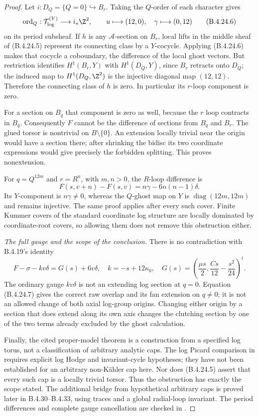 \begin{proof}
Let $i:D_Q=\{Q=0\}\hookrightarrow B_r$.
Taking the $Q$-order of each character gives
\[
 \operatorname{ord}_Q:
 \mathcal T_{\log}^{(Y)}\longrightarrow i_*\Z^2,
 \qquad
 u\longmapsto(12,0),\quad
 \gamma\longmapsto(0,12)
 \tag{B.4.24.6}
\]
on its period subsheaf. If $h$ is any
$\mathcal A$-section on $B_r$, local lifts in
the middle sheaf of (B.4.24.5) represent its
connecting class by a $Y$-cocycle. Applying
(B.4.24.6) makes that cocycle a coboundary,
the difference of the local ghost vectors.
But restriction identifies $H^1(B_r,Y)$ with
$H^1(D_Q,Y)$, since $B_r$ retracts onto $D_Q$;
the induced map to $H^1(D_Q,\Z^2)$ is the
injective diagonal map $(12,12)$. Therefore
the connecting class of $h$ is zero. In
particular its $r$-loop component is zero.

For a section on $B_q$ that component is zero
as well, because the $r$ loop contracts in $B_q$.
Consequently $F$ cannot be the difference of
sections from $B_q$ and $B_r$. The glued torsor
is nontrivial on $B\setminus\{0\}$. An extension
locally trivial near the origin would have a
section there; after shrinking the bidisc its
two coordinate expressions would give precisely
the forbidden splitting. This proves nonextension.

For $q=Q^{12m}$ and $r=R^n$, with $m,n>0$,
the $R$-loop difference is
\[
 F(s,v+n)-F(s,v)
    =n\gamma-6n(n-1)\delta.
\]
Its $Y$-component is $n\gamma\ne0$,
whereas the $Q$-ghost map on $Y$ is
$\operatorname{diag}(12m,12m)$ and remains
injective. The same proof applies after every
such cover. Finite Kummer covers of the standard
coordinate log structure are locally dominated
by coordinate-root covers, so allowing them
does not remove this obstruction either.

\emph{The full gauge and the scope of the conclusion.}
There is no contradiction with B.4.19's identity
\[
 F-\sigma-kv\delta=G(s)+6v\delta,
 \quad k=-s+12\kappa_0,
 \quad G(s)=\left(\frac{\mu s}2,
                  \frac{Cs}{12}-\frac{s^2}{24}\right)^t.
 \tag{B.4.24.7}
\]
The ordinary gauge $kv\delta$ is not an extending
log section at $q=0$. Equation (B.4.24.7) gives
the correct raw overlap and its fan extension
on $q\ne0$; it is not an allowed change of
both axial log-group origins. Changing either
origin by a section that does extend along its
own axis changes the clutching section by one
of the two terms already excluded by the
ghost calculation.

Finally, the cited proper-model theorem is a
construction from a specified log torus, not
a classification of arbitrary analytic caps.
The log Picard comparison in
\citet[Sections 7--9]{KKN2008PicardE} requires
explicit log Hodge and invariant-cycle hypotheses;
they have not been established for an arbitrary
non-K\"ahler cap here. Nor does (B.4.24.5)
assert that every such cap is a locally trivial
torsor. Thus the obstruction has exactly the
scope stated. The additional bridge from hypothetical
arbitrary caps is proved later in B.4.30--B.4.33,
using traces and a global radial-loop invariant.
The period differences and complete
gauge cancellation are checked in
.
\end{proof}

